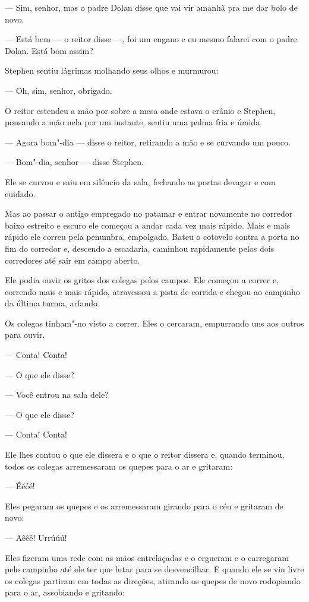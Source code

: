  --- Sim, senhor, mas o padre Dolan disse que vai vir amanhã pra me dar
bolo de novo.

 --- Está bem --- o reitor disse ---, foi um engano e eu mesmo falarei com o padre
Dolan. Está bom assim?

Stephen sentiu lágrimas molhando seus olhos e murmurou:

 --- Oh, sim, senhor, obrigado.

O reitor estendeu a mão por sobre a mesa onde estava o crânio e Stephen,
pousando a mão nela por um instante, sentiu uma palma fria e úmida.

 --- Agora bom"-dia --- disse o reitor, retirando a mão e se curvando um pouco.

 --- Bom"-dia, senhor --- disse Stephen.

Ele se curvou e saiu em silêncio da sala, fechando as portas devagar e
com cuidado.

Mas ao passar o antigo empregado no patamar e entrar novamente no
corredor baixo estreito e escuro ele começou a andar cada vez mais
rápido. Mais e mais rápido ele correu pela penumbra, empolgado. Bateu o
cotovelo contra a porta no fim do corredor e, descendo a escadaria,
caminhou rapidamente pelos dois corredores até sair em campo aberto.

Ele podia ouvir os gritos dos colegas pelos campos. Ele começou a correr
e, correndo mais e mais rápido, atravessou a pista de corrida e chegou
ao campinho da última turma, arfando.

Os colegas tinham"-no visto a correr. Eles o cercaram, empurrando uns aos
outros para ouvir.

 --- Conta! Conta!

 --- O que ele disse?

 --- Você entrou na sala dele?

 --- O que ele disse?

 --- Conta! Conta!

Ele lhes contou o que ele dissera e o que o reitor dissera e, quando
terminou, todos os colegas arremessaram os quepes para o ar e gritaram:

 --- Éééé!

Eles pegaram os quepes e os arremessaram girando para o céu e gritaram
de novo:

 --- Aêêê! Urrúúú!

Eles fizeram uma rede com as mãos entrelaçadas e o ergueram e o
carregaram pelo campinho até ele ter que lutar para se desvencilhar. E
quando ele se viu livre os colegas partiram em todas as direções,
atirando os quepes de novo rodopiando para o ar, assobiando e gritando:

